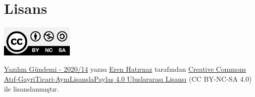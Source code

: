 \documentclass[11pt]{article}
\begin{document}
\section{Lisans}
\label{sec:org2d97698}
\begin{center}
\begin{center}
\includegraphics[height=1.5cm]{../../../img/CC_BY-NC-SA_4.0.png}
\end{center}

\href{yazilim-gundemi-2020-14.pdf}{Yazılım Gündemi - 2020/14} yazısı \href{https://erenhatirnaz.github.io}{Eren Hatırnaz} tarafından \href{http://creativecommons.org/licenses/by-nc-sa/4.0/}{Creative Commons
Atıf-GayriTicari-AynıLisanslaPaylaş 4.0 Uluslararası Lisansı} (CC BY-NC-SA 4.0)
ile lisanslanmıştır.
\end{center}
\end{document}
